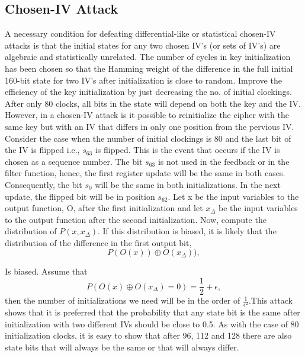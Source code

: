 \subsection{Chosen-IV Attack}
A necessary condition for defeating differential-like or statistical chosen-IV attacks is that the initial states for any two chosen IV’s (or sets of IV’s) are algebraic and statistically unrelated. The number of cycles in key initialization has been chosen so that the Hamming weight of the difference in the full initial 160-bit state for two IV’s after initialization is close to random.
Improve the efficiency of the key initialization by just decreasing the no. of initial clockings. After only 80 clocks, all bits in the state will depend on both the key and the IV. However, in a chosen-IV attack is it possible to reinitialize the cipher with the same key but with an IV that differs in only one position from the pervious IV. Consider the case when the number of initial clockings is 80 and the last bit of the IV is flipped i.e., $s_{63}$ is flipped. This is the event that occurs if the IV is chosen as a sequence number. The bit $s_{63}$ is not used in the feedback or in the filter function, hence, the first register update will be the same in both
cases. Consequently, the bit $s_0$ will be the same in both initializations. In the next update, the flipped bit will be in position $s_{62}$. Let x be the input variables to the output function, O, after the first initialization and let $x_\Delta$ be the input variables to the output function after the second initialization. Now, compute the distribution of $P(x,x_\Delta)$. If this distribution is biased, it is likely that the distribution of the difference in the
first output bit,
\begin{equation}
	P(O(x)) \oplus O(x_\Delta)),
\end{equation} 

Is biased. Assume that
\begin{equation}
P(O(x) \oplus O(x_\Delta)=0)=\frac{1}{2}+\epsilon,
\end{equation} 
then the number of initializations we need will be in the order of $\frac{1}{\epsilon^2} $.This attack shows that it is preferred that the probability that any state bit is the same after initialization with two different IVs should be close to 0.5. As with the case of 80 initialization clocks, it is easy to show that after 96, 112 and 128 there are also state bits that will always be the same or that will always differ.


